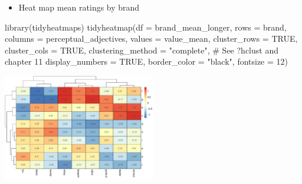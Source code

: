 \documentclass[
  ignorenonframetext,
]{beamer}
\newenvironment{Shaded}{\begin{snugshade}}{\end{snugshade}}
\newcommand{\AttributeTok}[1]{\textcolor[rgb]{0.40,0.45,0.13}{#1}}
\newcommand{\CommentTok}[1]{\textcolor[rgb]{0.37,0.37,0.37}{#1}}
\newcommand{\ConstantTok}[1]{\textcolor[rgb]{0.56,0.35,0.01}{#1}}
\newcommand{\DecValTok}[1]{\textcolor[rgb]{0.68,0.00,0.00}{#1}}
\newcommand{\FunctionTok}[1]{\textcolor[rgb]{0.28,0.35,0.67}{#1}}
\newcommand{\NormalTok}[1]{\textcolor[rgb]{0.00,0.23,0.31}{#1}}
\newcommand{\StringTok}[1]{\textcolor[rgb]{0.13,0.47,0.30}{#1}}
\providecommand{\tightlist}{%
  \setlength{\itemsep}{0pt}\setlength{\parskip}{0pt}}\usepackage{longtable,booktabs,array}
\begin{document}
\begin{frame}[fragile]{}
\label{section-10}
\begin{itemize}
\tightlist
\item
  Heat map mean ratings by brand
\end{itemize}

\tiny

\begin{Shaded}
\begin{Highlighting}[]
\FunctionTok{library}\NormalTok{(tidyheatmaps)}
\FunctionTok{tidyheatmap}\NormalTok{(}\AttributeTok{df =}\NormalTok{ brand\_mean\_longer, }
            \AttributeTok{rows =}\NormalTok{ brand, }\AttributeTok{columns =}\NormalTok{ perceptual\_adjectives, }\AttributeTok{values =}\NormalTok{ value\_mean,}
            \AttributeTok{cluster\_rows =} \ConstantTok{TRUE}\NormalTok{, }\AttributeTok{cluster\_cols =} \ConstantTok{TRUE}\NormalTok{,}
            \AttributeTok{clustering\_method =} \StringTok{"complete"}\NormalTok{, }\CommentTok{\# See ?hclust and chapter 11}
            \AttributeTok{display\_numbers =} \ConstantTok{TRUE}\NormalTok{, }\AttributeTok{border\_color =} \StringTok{"black"}\NormalTok{, }\AttributeTok{fontsize =} \DecValTok{12}\NormalTok{)}
\end{Highlighting}
\end{Shaded}

\begin{center}
\includegraphics[width=0.5\textwidth,height=\textheight]{008_reducing_data_complexity_files/figure-beamer/unnamed-chunk-9-1.pdf}
\end{center}
\end{frame}
\end{document}
